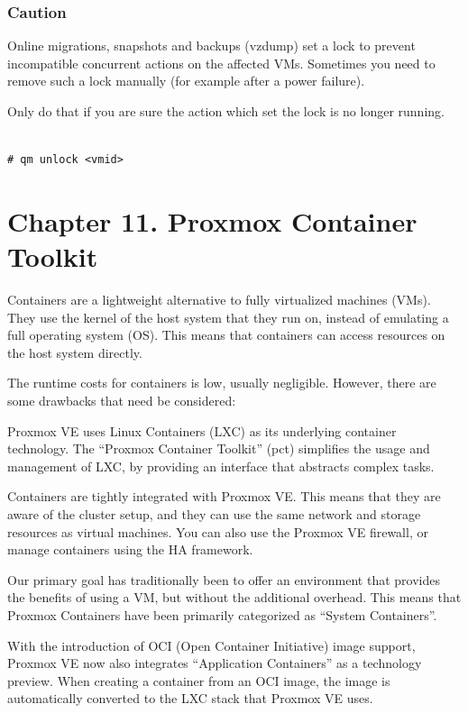 \subsubsection{Caution}

Online migrations, snapshots and backups (vzdump) set a lock to prevent incompatible concurrent actions on the affected VMs. Sometimes you need to remove such a lock manually (for example after a power failure).

Only do that if you are sure the action which set the lock is no longer running.

\begin{lstlisting}

# qm unlock <vmid>

\end{lstlisting}


\section{Chapter 11. Proxmox Container Toolkit}

Containers are a lightweight alternative to fully virtualized machines (VMs). They use the kernel of the host system that they run on, instead of emulating a full operating system (OS). This means that containers can access resources on the host system directly.

The runtime costs for containers is low, usually negligible. However, there are some drawbacks that need be considered:

Proxmox VE uses Linux Containers (LXC) as its underlying container technology. The “Proxmox Container Toolkit” (pct) simplifies the usage and management of LXC, by providing an interface that abstracts complex tasks.

Containers are tightly integrated with Proxmox VE. This means that they are aware of the cluster setup, and they can use the same network and storage resources as virtual machines. You can also use the Proxmox VE firewall, or manage containers using the HA framework.

Our primary goal has traditionally been to offer an environment that provides the benefits of using a VM, but without the additional overhead. This means that Proxmox Containers have been primarily categorized as “System Containers”.

With the introduction of OCI (Open Container Initiative) image support, Proxmox VE now also integrates “Application Containers” as a technology preview. When creating a container from an OCI image, the image is automatically converted to the LXC stack that Proxmox VE uses.

